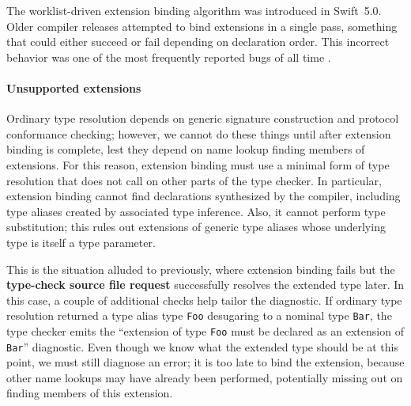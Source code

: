 \documentclass[../generics]{subfiles}
\begin{document}
The worklist-driven extension binding algorithm was introduced in Swift~5.0. Older compiler releases attempted to bind extensions in a single pass, something that could either succeed or fail depending on declaration order. This incorrect behavior was one of the most frequently reported bugs of all time \cite{sr631}.

%
\paragraph{Unsupported extensions}
%
%
%
%
%
Ordinary type resolution depends on generic signature construction and protocol conformance checking; however, we cannot do these things until after extension binding is complete, lest they depend on name lookup finding members of extensions. For this reason, extension binding must use a minimal form of type resolution that does not call on other parts of the type checker. In particular, extension binding cannot find declarations synthesized by the compiler, including type aliases created by associated type inference. Also, it cannot perform type substitution; this rules out extensions of generic type aliases whose underlying type is itself a type parameter.

This is the situation alluded to previously, where extension binding fails but the \textbf{type-check source file request} successfully resolves the extended type later. In this case, a couple of additional checks help tailor the diagnostic. If ordinary type resolution returned a type alias type \texttt{Foo} desugaring to a nominal type \texttt{Bar}, the type checker emits the ``extension of type \texttt{Foo} must be declared as an extension of \texttt{Bar}'' diagnostic. Even though we know what the extended type should be at this point, we must still diagnose an error; it is too late to bind the extension, because other name lookups may have already been performed, potentially missing out on finding members of this extension.
\end{document}
